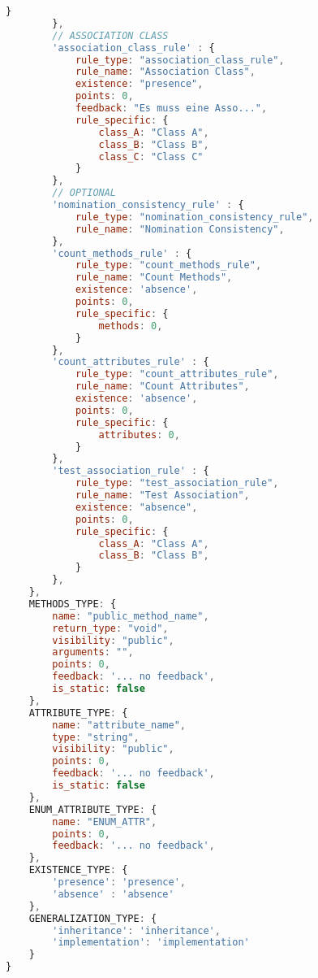 \begin{lstlisting}[caption={Rules Definition JSON}, label={lst:rules_def}, language=javascript]
            }
        },
        // ASSOCIATION CLASS
        'association_class_rule' : {
            rule_type: "association_class_rule",
            rule_name: "Association Class",
            existence: "presence",
            points: 0,
            feedback: "Es muss eine Asso...",
            rule_specific: {
                class_A: "Class A",
                class_B: "Class B",
                class_C: "Class C"
            }
        },
        // OPTIONAL
        'nomination_consistency_rule' : {
            rule_type: "nomination_consistency_rule",
            rule_name: "Nomination Consistency",
        },
        'count_methods_rule' : {
            rule_type: "count_methods_rule",
            rule_name: "Count Methods",
            existence: 'absence',
            points: 0,
            rule_specific: {
                methods: 0,
            }
        },
        'count_attributes_rule' : {
            rule_type: "count_attributes_rule",
            rule_name: "Count Attributes",
            existence: 'absence',
            points: 0,
            rule_specific: {
                attributes: 0,
            }
        },
        'test_association_rule' : {
            rule_type: "test_association_rule",
            rule_name: "Test Association",
            existence: "absence",
            points: 0,
            rule_specific: {
                class_A: "Class A",
                class_B: "Class B",
            }
        },
    },
    METHODS_TYPE: {
        name: "public_method_name",
        return_type: "void",
        visibility: "public",
        arguments: "",
        points: 0,
        feedback: '... no feedback',
        is_static: false
    },
    ATTRIBUTE_TYPE: {
        name: "attribute_name",
        type: "string",
        visibility: "public",
        points: 0,
        feedback: '... no feedback',
        is_static: false
    },
    ENUM_ATTRIBUTE_TYPE: {
        name: "ENUM_ATTR",
        points: 0,
        feedback: '... no feedback',
    },
    EXISTENCE_TYPE: {
        'presence': 'presence',
        'absence' : 'absence'
    },
    GENERALIZATION_TYPE: {
        'inheritance': 'inheritance',
        'implementation': 'implementation'
    }
}
\end{lstlisting}

\newpage

